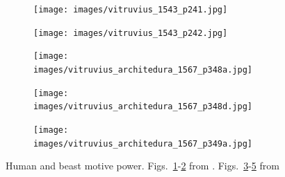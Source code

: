 \documentclass[a4paper, 12pt]{article}
\begin{document}




\begin{figure}[H]
    \centering
    
    \begin{subfigure}{.45\textwidth}
        \centering
        \texttt{[image: images/vitruvius\_1543\_p241.jpg]}
        \caption{} \label{fig:vitruvius_1543_p241}
    \end{subfigure}
    \hspace{2em}%
    \begin{subfigure}{.45\textwidth}
        \centering
        \texttt{[image: images/vitruvius\_1543\_p242.jpg]}
        \caption{} \label{fig:vitruvius_1543_p242}
    \end{subfigure}
    \hspace{1em}%
    \begin{subfigure}{.3\textwidth}
        \centering
        \texttt{[image: images/vitruvius\_architedura\_1567\_p348a.jpg]}
        \caption{} \label{fig:vitruvius_architedura_1567_p348a}
    \end{subfigure}%
    \hspace{1em}%
    \begin{subfigure}{.3\textwidth}
        \centering
        \texttt{[image: images/vitruvius\_architedura\_1567\_p348d.jpg]}
        \caption{} \label{fig:vitruvius_architedura_1567_p348d}
    \end{subfigure}%
    \hspace{2em}%
    \begin{subfigure}{.3\textwidth}
        \centering
        \texttt{[image: images/vitruvius\_architedura\_1567\_p349a.jpg]}
        \caption{} \label{fig:vitruvius_architedura_1567_p349a}
    \end{subfigure}
    \caption{Human and beast motive power. Figs.~\ref{fig:vitruvius_1543_p241}-\ref{fig:vitruvius_1543_p242} from \citet[pp.~241,242]{vitruvius_architectvra_1543}. Figs.~\ref{fig:vitruvius_architedura_1567_p348a}-\ref{fig:vitruvius_architedura_1567_p349a} from \citet[pp.~348-349]{vitruvius_architedura_1567}}  \label{fig:wheels:human:beast:power}
\end{figure}
\end{document}
